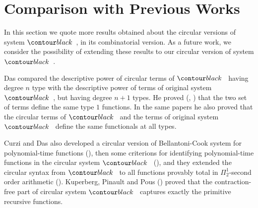 \section{Comparison with Previous Works}
\label{section-comparison}

In this section we quote more results obtained about the circular versions of system $\systemT$,
in its combinatorial version. As a future work, we consider the possibility of extending these results
to our circular version of system $\systemT$.

Das compared the descriptive power of circular terms of $\systemT$ 
having degree $n$ type with the descriptive power of terms of original system $\systemT$,
but having degree $n+1$ types. 
He  proved (\cite{2021-Anupam-Das}, \cite{DBLP:conf/fscd/000221})
that the two set of terms define the same type $1$ functions. In the same papers he also proved 
that the circular terms of $\systemT$ and the terms of original system $\systemT$ 
define the same functionals at all types.

Curzi and Das  also developed a circular version of Bellantoni-Cook system for 
polynomial-time functions (\cite{DBLP:conf/lics/Curzi022}), 
then some criterions for identifying polynomial-time functions
in the circular system $\systemT$ (\cite{DBLP:conf/csl/Curzi023}),
and they extended the circular syntax from $\systemT$ to all functions provably total in 
$\Pi^1_2$-second order arithmetic (\cite{DBLP:conf/lics/Curzi023}).
Kuperberg, Pinault and Pous (\cite{2021-Kuperberg-Pinault-Pous})
proved that the contraction-free part of circular system $\systemT$
captures exactly the primitive recursive functions.
